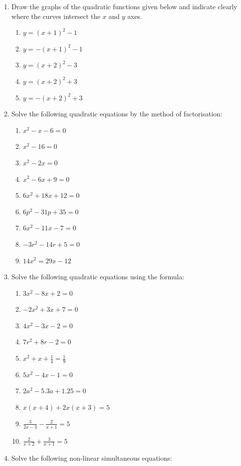 \documentclass[
  english,
  12pt,
  oneside]{book}
\providecommand{\tightlist}{%
  \setlength{\itemsep}{0pt}\setlength{\parskip}{0pt}}
\theoremstyle{definition}
\theoremstyle{definition}
\theoremstyle{definition}
\theoremstyle{definition}
\theoremstyle{remark}
\begin{document}
\begin{enumerate}
\def\labelenumi{\arabic{enumi}.}
\item
  Draw the graphs of the quadratic functions given below and indicate clearly where the curves intersect the \(x\) and \(y\) axes.

  \begin{enumerate}
  \def\labelenumii{\roman{enumii})}
  \tightlist
  \item
    \(y=(x+1)^2-1\)
  \item
    \(y=-(x+1)^2-1\)
  \item
    \(y=(x+2)^2-3\)
  \item
    \(y=(x+2)^2+3\)
  \item
    \(y=-(x+2)^2+3\)
  \end{enumerate}
\item
  Solve the following quadratic equations by the method of factorisation:

  \begin{enumerate}
  \def\labelenumii{\roman{enumii})}
  \tightlist
  \item
    \(x^2-x-6=0\)
  \item
    \(x^2-16=0\)
  \item
    \(x^2-2x=0\)
  \item
    \(x^2-6x+9=0\)
  \item
    \(6x^2+18x+12=0\)
  \item
    \(6p^2-31p+35=0\)
  \item
    \(6x^2-11x-7=0\)
  \item
    \(-3r^2-14r+5=0\)
  \item
    \(14x^2=29x-12\)
  \end{enumerate}
\item
  Solve the following quadratic equations using the formula:

  \begin{enumerate}
  \def\labelenumii{\roman{enumii})}
  \tightlist
  \item
    \(3x^2-8x+2=0\)
  \item
    \(-2x^2+3x+7=0\)
  \item
    \(4x^2-3x-2=0\)
  \item
    \(7r^2+8r-2=0\)
  \item
    \(x^2+x+\frac14=\frac19\)
  \item
    \(5x^2-4x-1=0\)
  \item
    \(2a^2-5.3a+1.25=0\)
  \item
    \(x(x+4)+2x(x+3)=5\)
  \item
    \(\frac{3}{2x-3}-\frac{2}{x+1}=5\)
  \item
    \(\frac{2}{x+2}+\frac{3}{x+1}=5\)
  \end{enumerate}
\item
  Solve the following non-linear simultaneous equations:


\end{enumerate}
\end{document}

